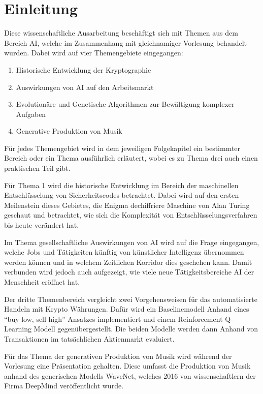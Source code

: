 \chapter{Einleitung}

\nocite{*}

Diese wissenschaftliche Ausarbeitung beschäftigt sich mit Themen aus dem Bereich \ac{AI}, welche im Zusammenhang mit gleichnamiger Vorlesung behandelt wurden. Dabei wird auf vier Themengebiete eingegangen:

\begin{enumerate}
	\item Historische Entwicklung der Kryptographie
	\item Auswirkungen von \ac{AI} auf den Arbeitsmarkt
	\item Evolutionäre und Genetische Algorithmen zur Bewältigung komplexer Aufgaben
	\item Generative Produktion von Musik
\end{enumerate}

Für jedes Themengebiet wird in dem jeweiligen Folgekapitel ein bestimmter Bereich oder ein Thema ausführlich erläutert, wobei es zu Thema drei auch einen praktischen Teil gibt.

Für Thema 1 wird die historische Entwicklung im Bereich der maschinellen Entschlüsselung von Sicherheitscodes betrachtet. Dabei wird auf den ersten Meilenstein dieses Gebietes, die Enigma dechiffriere Maschine von Alan Turing geschaut und betrachtet, wie sich die Komplexität von Entschlüsselungsverfahren bis heute verändert hat.

Im Thema gesellschaftliche Auswirkungen von \ac{AI} wird auf die Frage eingegangen, welche Jobs und Tätigkeiten künftig von künstlicher Intelligenz übernommen werden können und in welchem Zeitlichen Korridor dies geschehen kann. Damit verbunden wird jedoch auch aufgezeigt, wie viele neue Tätigkeitsbereiche \ac{AI} der Menschheit eröffnet hat.

Der dritte Themenbereich vergleicht zwei Vorgehensweisen für das automatisierte Handeln mit Krypto Währungen. Dafür wird ein Baselinemodell Anhand eines \enquote{buy low, sell high} Ansatzes implementiert und einem Reinforcement Q-Learning Modell gegenübergestellt. Die beiden Modelle werden dann Anhand von Transaktionen im tatsächlichen Aktienmarkt evaluiert.

Für das Thema der generativen Produktion von Musik wird während der Vorlesung eine Präsentation gehalten. Diese umfasst die Produktion von Musik anhand des generischen Modells WaveNet, welches 2016 von wissenschaftlern der Firma DeepMind veröffentlicht wurde.

